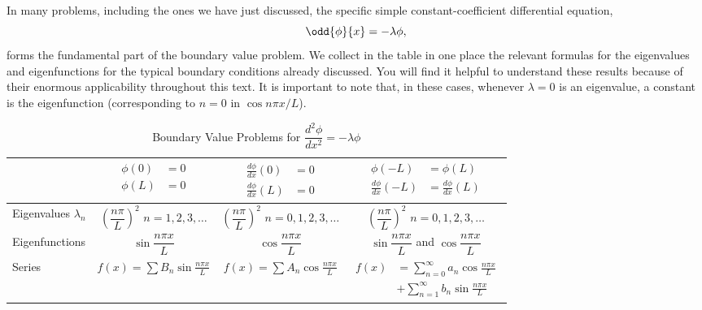 In many problems, including the ones we have just discussed, the specific simple constant-coefficient differential equation,
\[
\odd{\phi}{x} = -\lambda\phi,
\]
forms the fundamental part of the boundary value problem. We collect in the table in one place the relevant formulas for the eigenvalues and eigenfunctions for the typical boundary conditions already discussed. You will find it helpful to understand these results because of their enormous applicability throughout this text. It is important to note that, in these cases, whenever $\lambda = 0$ is an eigenvalue, a constant is the eigenfunction (corresponding to $n = 0$ in $\cos n\pi x/L$).

\begin{table}[H]
\centering
\caption{Boundary Value Problems for $\dfrac{d^2\phi}{dx^2} = -\lambda\phi$}
\label{tab:2.4.1}
\renewcommand{\arraystretch}{2.2}
\begin{tabular}{@{}l|c|c|c@{}}
\toprule
& $\begin{aligned}\phi(0) &= 0 \\ \phi(L) &= 0\end{aligned}$
& $\begin{aligned}\frac{d\phi}{dx}(0) &= 0 \\ \frac{d\phi}{dx}(L) &= 0\end{aligned}$
& $\begin{aligned}\phi(-L) &= \phi(L) \\ \frac{d\phi}{dx}(-L) &= \frac{d\phi}{dx}(L)\end{aligned}$ \\
\midrule
Eigenvalues $\lambda_n$
& $\left(\dfrac{n\pi}{L}\right)^2$ \newline $n = 1,2,3,\ldots$
& $\left(\dfrac{n\pi}{L}\right)^2$ \newline $n = 0,1,2,3,\ldots$
& $\left(\dfrac{n\pi}{L}\right)^2$ \newline $n = 0,1,2,3,\ldots$ \\
\midrule
Eigenfunctions
& $\sin\dfrac{n\pi x}{L}$
& $\cos\dfrac{n\pi x}{L}$
& $\sin\dfrac{n\pi x}{L}$ and $\cos\dfrac{n\pi x}{L}$ \\
\midrule
Series
& $f(x) = \displaystyle\sum B_n\sin\frac{n\pi x}{L}$
& $f(x) = \displaystyle\sum A_n\cos\frac{n\pi x}{L}$
& $\begin{aligned}f(x) &= \displaystyle\sum_{n=0}^{\infty} a_n\cos\frac{n\pi x}{L} \\[4pt]
&+ \displaystyle\sum_{n=1}^{\infty} b_n\sin\frac{n\pi x}{L}\end{aligned}$ \\

\end{tabular}
\end{table}

